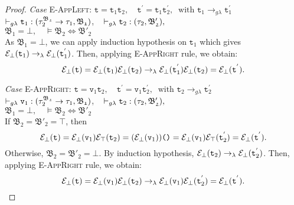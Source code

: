 \begin{proof}
\noindent\textit{Case} \textsc{E-AppLeft}: \qquad 
 $\texttt{t} = \texttt{t}_{1} \texttt{t}_{2},\quad
 \texttt{t}^{'} = \texttt{t}_{1} \texttt{t}^{'}_{2}, ~ \text{ with }
 \texttt{t}_{1} \rightarrow_{g\lambda} \texttt{t}^{'}_{1}$ \\
$\vdash_{g\lambda} \texttt{t}_{1} : (\tau_{2}^{\mathfrak{B_{2}}} \rightarrow \tau_{1}, \mathfrak{B_{1}})$,  ~
$\vdash_{g\lambda} \texttt{t}_{2} : (\tau_{2}, \mathfrak{B'_{2}}), $ \\ 
$ \mathfrak{B_{1}} = \bot,  \quad 
\vDash\mathfrak{B_{2}} \Leftrightarrow \mathfrak{B'_{2}} $ \\

As $\mathfrak{B_{1}} = \bot$, we can apply induction hypothesis on
$\texttt{t}_{1}$ which gives  
$\mathcal{E}_{\bot}(\texttt{t}_{1}) \rightarrow_{\lambda} 
\mathcal{E}_{\bot}(\texttt{t}_{1}^{'})$.
Then, applying \textsc{E-AppRight} rule, we obtain:
$$
\mathcal{E}_{\bot}(\texttt{t}) 
= \mathcal{E}_{\bot}(\texttt{t}_{1})\mathcal{E}_{\bot}(\texttt{t}_{2})
\rightarrow_{\lambda} 
\mathcal{E}_{\bot}(\texttt{t}^{'}_{1})\mathcal{E}_{\bot}(\texttt{t}_{2})
= \mathcal{E}_{\bot}(\texttt{t}^{'}).$$




\noindent\textit{Case} \textsc{E-AppRight}: \qquad 
 $\texttt{t} = \texttt{v}_{1} \texttt{t}_{2},\quad
 \texttt{t}^{'} = \texttt{v}_{1} \texttt{t}^{'}_{2}, ~ \text{ with }
 \texttt{t}_{2} \rightarrow_{g\lambda} \texttt{t}^{'}_{2}$ \\
$\vdash_{g\lambda} \texttt{v}_{1} : (\tau_{2}^{\mathfrak{B_{2}}} \rightarrow \tau_{1}, \mathfrak{B_{1}})$,  ~
$\vdash_{g\lambda} \texttt{t}_{2} : (\tau_{2}, \mathfrak{B'_{2}}), $ \\ 
$ \mathfrak{B_{1}} = \bot,  \quad 
\vDash\mathfrak{B_{2}} \Leftrightarrow \mathfrak{B'_{2}} $ \\
If $\mathfrak{B_{2}} = \mathfrak{B'_{2}} = \top $, then
$$\mathcal{E}_{\bot}(\texttt{t}) 
= \mathcal{E}_{\bot}(\texttt{v}_{1})\mathcal{E}_{\top}(\texttt{t}_{2})
= (\mathcal{E}_{\bot}(\texttt{v}_{1}))\texttt{()}
= \mathcal{E}_{\bot}(\texttt{v}_{1})\mathcal{E}_{\top}(\texttt{t}^{'}_{2})
= \mathcal{E}_{\bot}(\texttt{t}^{'}). $$
Otherwise, $\mathfrak{B_{2}} = \mathfrak{B'_{2}} = \bot $.
By induction hypothesis, 
$\mathcal{E}_{\bot}(\texttt{t}_{2}) \rightarrow_{\lambda} 
\mathcal{E}_{\bot}(\texttt{t}_{2}^{'})$.
Then, applying \textsc{E-AppRight} rule, we obtain:
$$
\mathcal{E}_{\bot}(\texttt{t}) 
= \mathcal{E}_{\bot}(\texttt{v}_{1})\mathcal{E}_{\bot}(\texttt{t}_{2})
\rightarrow_{\lambda} 
\mathcal{E}_{\bot}(\texttt{v}_{1})\mathcal{E}_{\bot}(\texttt{t}^{'}_{2})
= \mathcal{E}_{\bot}(\texttt{t}^{'}).$$




%
%
 

\end{proof}

